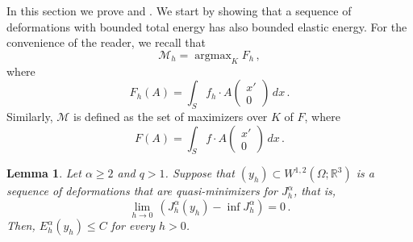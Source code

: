 \documentclass{article}
\theoremstyle{plain}
\theoremstyle{plain}
\theoremstyle{plain}
\newtheorem{lemma}[teo]{Lemma}
\theoremstyle{plain}
\theoremstyle{plain}
\theoremstyle{definition}
\theoremstyle{definition}
\renewcommand{\r}{\mathbb{R}}
\DeclareMathOperator*{\argmax}{argmax}
\begin{document}
In this section we prove  and . We start by showing that a sequence of deformations with bounded total energy has also bounded elastic energy.
For the convenience of the reader, we recall that
\[	
\mathcal{M}_{h} = \argmax_{K} F_{h} \,,
\]
where
\[
	F_{h}(A) = \int_S f_{h} \cdot A \begin{pmatrix}
	x' \\ 0
	\end{pmatrix} \, dx \,.
\]
Similarly, $ \mathcal{M} $ is defined as the set of maximizers over $ K $ of $ F $, where 
\[
	F(A) = \int_S f \cdot A \begin{pmatrix}
	x' \\ 0
	\end{pmatrix} \, dx \,.
\]

\begin{lemma}\label{lemma:compactness_forces}
	Let $\alpha \geq 2$ and $q > 1$. Suppose that $(y_h) \subset W^{1,2}(\Omega; \r^3)$ is a sequence of deformations that are quasi-minimizers for $J_h^\alpha$, that is,
	\[
	\lim_{h \to 0} \, (J_h^\alpha(y_h) - \inf J_h^\alpha) =0 \,.
	\]
	Then, $E_h^\alpha(y_h) \leq C$ for every $h > 0$.
\end{lemma}
\end{document}
